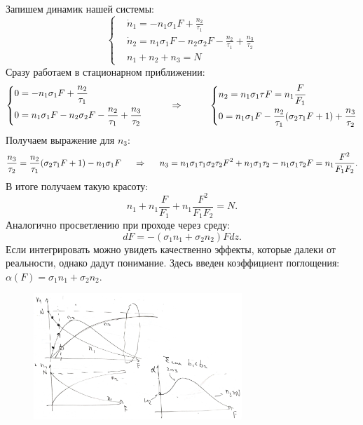 Запишем динамик нашей системы:
\begin{equation*}
\left\{
	\begin{aligned}
		&\dot{n}_1 = - n_1 \sigma_1 F + \frac{n_2}{\tau_1}\\
		&\dot{n}_2 = n_1 \sigma_1 F - n_2 \sigma_2 F - \frac{n_2}{\tau_1} + \frac{n_3}{\tau_2}\\
		&n_1 + n_2 + n_3 = N
	\end{aligned}
	\right.
\end{equation*}
Сразу работаем в стационарном приближении:
\begin{equation*}
\left\{
	\begin{aligned}
		&0  = - n_1 \sigma_1 F + \frac{n_2}{\tau_1}\\
		&0=n_1 \sigma_1 F - n_2 \sigma_2 F - \frac{n_2}{\tau_1} + \frac{n_3}{\tau_2}
	\end{aligned}
\right.
\hspace{1 cm}
\Rightarrow
\hspace{1 cm}
\left\{
	\begin{aligned}
		&n_2 = n_1 \sigma_1 \tau F = n_1 \frac{F}{F_1}\\
		&0= n_1 \sigma_1 F - \frac{n_2}{\tau_1} (\sigma_2 \tau_1 F +1)  + \frac{n_3}{\tau_2}
	\end{aligned}
\right.
\end{equation*}
Получаем выражение для $n_3$:
\begin{equation*}
	\frac{n_3}{\tau_2} =  \frac{n_2}{\tau_1} (\sigma_2 \tau_1 F +1)  - n_1 \sigma_1 F
	\hspace{0.5 cm}
	\Rightarrow
	\hspace{0.5 cm}
	n_3 = n_1 \sigma_1 \tau_1 \sigma_2 \tau_2 F^2 + n_1 \sigma_1 \tau_2 - n_1 \sigma_1 \tau_2 F = n_1 \frac{F^2}{F_1 F_2}.
\end{equation*}
В итоге получаем такую красоту:
\begin{equation*}
	n_1 + n_1 \frac{F}{F_1} + n_1 \frac{F^2}{F_1 F_2} = N.
\end{equation*}
Аналогично просветлению при проходе через среду:
\begin{equation*}
	d F = - (\sigma_1 n_1 + \sigma_2 n_2) F dz.
\end{equation*}
Если интегрировать можно увидеть качественно эффекты, которые далеки от реальности, однако дадут понимание. Здесь введен коэффициент поглощения: $\alpha(F) = \sigma_1 n_1 + \sigma_2 n_2$.

\begin{figure}[h]
    \centering
    \includegraphics[width=0.7\textwidth]{img/konetz_zatemn.png}
\end{figure}

